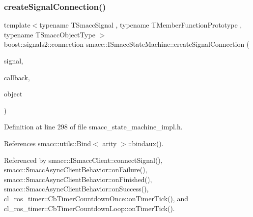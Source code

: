 \subsubsection{\texorpdfstring{create\+Signal\+Connection()}{createSignalConnection()}}
{\footnotesize\ttfamily template$<$typename T\+Smacc\+Signal , typename T\+Member\+Function\+Prototype , typename T\+Smacc\+Object\+Type $>$ \\
boost\+::signals2\+::connection smacc\+::\+I\+Smacc\+State\+Machine\+::create\+Signal\+Connection (\begin{DoxyParamCaption}\item[{T\+Smacc\+Signal \&}]{signal,  }\item[{T\+Member\+Function\+Prototype}]{callback,  }\item[{T\+Smacc\+Object\+Type $\ast$}]{object }\end{DoxyParamCaption})}



Definition at line 298 of file smacc\+\_\+state\+\_\+machine\+\_\+impl.\+h.



References smacc\+::utils\+::\+Bind$<$ arity $>$\+::bindaux().



Referenced by smacc\+::\+I\+Smacc\+Client\+::connect\+Signal(), smacc\+::\+Smacc\+Async\+Client\+Behavior\+::on\+Failure(), smacc\+::\+Smacc\+Async\+Client\+Behavior\+::on\+Finished(), smacc\+::\+Smacc\+Async\+Client\+Behavior\+::on\+Success(), cl\+\_\+ros\+\_\+timer\+::\+Cb\+Timer\+Countdown\+Once\+::on\+Timer\+Tick(), and cl\+\_\+ros\+\_\+timer\+::\+Cb\+Timer\+Countdown\+Loop\+::on\+Timer\+Tick().



